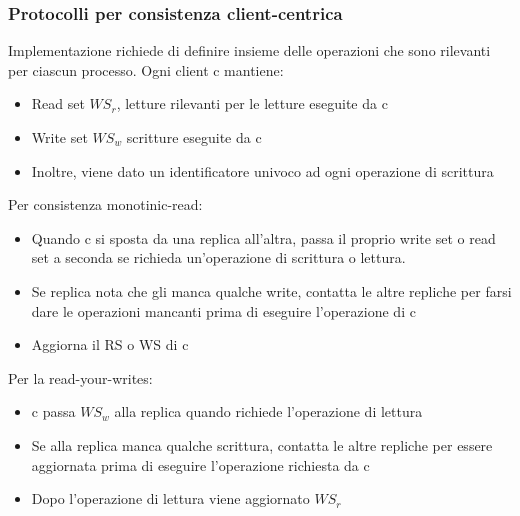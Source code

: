 \documentclass{article}
\begin{document}
\subsubsection{Protocolli per consistenza client-centrica}
Implementazione richiede di definire insieme delle operazioni che sono rilevanti per ciascun processo. Ogni client c mantiene:
\begin{itemize}
\item Read set $WS_r$, letture rilevanti per le letture eseguite da c
\item Write set $WS_w$ scritture eseguite da c
\item Inoltre, viene dato un identificatore univoco ad ogni operazione di scrittura
\end{itemize}
Per consistenza monotinic-read:
\begin{itemize}
\item Quando c si sposta da una replica all'altra, passa il proprio write set o read set a seconda se richieda un'operazione di scrittura o lettura.
\item Se replica nota che gli manca qualche write, contatta le altre repliche per farsi dare le operazioni mancanti prima di eseguire l'operazione di c
\item Aggiorna il RS o WS di c
\end{itemize}
Per la read-your-writes:
\begin{itemize}
\item c passa $WS_w$ alla replica quando richiede l'operazione di lettura
\item Se alla replica manca qualche scrittura, contatta le altre repliche per essere aggiornata prima di eseguire l'operazione richiesta da c
\item Dopo l'operazione di lettura viene aggiornato $WS_r$
\end{itemize}
\end{document}
